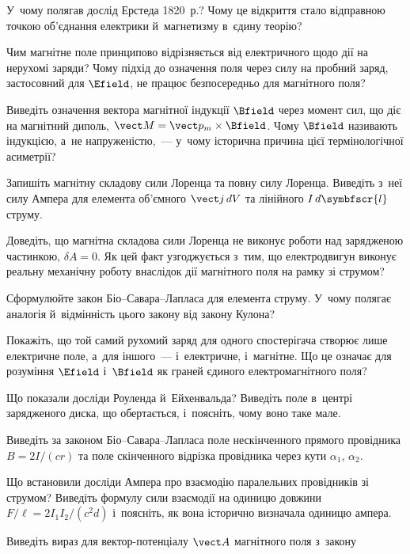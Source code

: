 \begin{Questions}
	\begin{quizlist}
		\item У~чому полягав дослід Ерстеда 1820~р.? Чому це відкриття стало відправною точкою
		об'єднання електрики й~магнетизму в~єдину теорію?
		\item Чим магнітне поле принципово відрізняється від електричного щодо дії на нерухомі
		заряди? Чому підхід до означення поля через силу на пробний заряд, застосовний для
		$\Efield$, не працює безпосередньо для магнітного поля?
		\item Виведіть означення вектора магнітної індукції $\Bfield$ через момент сил, що діє
		на магнітний диполь, $\vect M = \vect p_m\times\Bfield$. Чому $\Bfield$ називають
		індукцією, а~не напруженістю,~--- у~чому історична причина цієї термінологічної
		асиметрії?
		\item Запишіть магнітну складову сили Лоренца та повну силу Лоренца. Виведіть з~неї
		силу Ампера для елемента об'ємного $\vect j\,dV$ та лінійного $I\,d\symbfscr{l}$
		струму.
		\item Доведіть, що магнітна складова сили Лоренца не виконує роботи над зарядженою
		частинкою, $\delta A = 0$. Як цей факт узгоджується з~тим, що електродвигун виконує
		реальну механічну роботу внаслідок дії магнітного поля на рамку зі струмом?
		\item Сформулюйте закон Біо--Савара--Лапласа для елемента струму. У~чому полягає
		аналогія й~відмінність цього закону від закону Кулона?
		\item Покажіть, що той самий рухомий заряд для одного спостерігача створює лише
		електричне поле, а~для іншого~--- і~електричне, і~магнітне. Що це означає для
		розуміння $\Efield$ і~$\Bfield$ як граней єдиного електромагнітного поля?
		\item Що показали досліди Роуленда й~Ейхенвальда? Виведіть поле в~центрі зарядженого
		диска, що обертається, і~поясніть, чому воно таке мале.
		\item Виведіть за законом Біо--Савара--Лапласа поле нескінченного прямого провідника
		$B=2I/(cr)$ та поле скінченного відрізка провідника через кути $\alpha_1$,
		$\alpha_2$.
		\item Що встановили досліди Ампера про взаємодію паралельних провідників зі струмом?
		Виведіть формулу сили взаємодії на одиницю довжини $F/\ell = 2I_1I_2/(c^2d)$
		і~поясніть, як вона історично визначала одиницю ампера.
		\item Виведіть вираз для вектор-потенціалу $\vect A$ магнітного поля з~закону

\end{quizlist}
\end{Questions}

